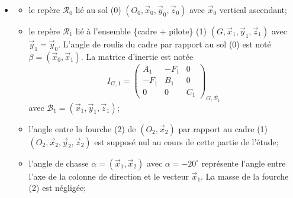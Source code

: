 \documentclass[10pt]{article}
\begin{document}
\begin{itemize}
  \item[]
  \begin{itemize}
    \item[-] le repère $\mathcal{R}_{0}$ lié au sol (0) $\left(O_{0}, \vec{x}_{0}, \vec{y}_{0}, \vec{z}_{0}\right)$ avec $\vec{x}_{0}$ vertical ascendant;
    \item[-] le repère $\mathcal{R}_{1}$ lié à l'ensemble \{cadre + pilote\} (1) $\left(G, \vec{x}_{1}, \vec{y}_{1}, \vec{z}_{1}\right)$ avec $\vec{y}_{1}=\vec{y}_{0}$. L'angle de roulis du cadre par rapport au sol (0) est noté $\beta=\left(\vec{x}_{0}, \vec{x}_{1}\right)$. La matrice d'inertie est notée
$$
I_{G, 1}=\left(\begin{array}{ccc}
A_{1} & -F_{1} & 0 \\
-F_{1} & B_{1} & 0 \\
0 & 0 & C_{1}
\end{array}\right)_{G, \mathcal{B}_{1}}
$$
avec $\mathcal{B}_{1}=\left(\vec{x}_{1}, \vec{y}_{1}, \vec{z}_{1}\right)$;
    \item[-] l'angle entre la fourche (2) de $\left(O_{2}, \vec{x}_{2}\right)$ par rapport au cadre (1) $\left(O_{2}, \vec{x}_{2}, \vec{y}_{2}, \vec{z}_{2}\right)$ est supposé nul au cours de cette partie de l'étude;
    \item[-] l'angle de chasse $\alpha=\left(\vec{x}_{1}, \vec{x}_{2}\right)$ avec $\alpha=-20^{\circ}$ représente l'angle entre l'axe de la colonne de direction et le vecteur $\vec{x}_{1}$. La masse de la fourche (2) est négligée;
  \end{itemize}
\end{itemize}
\end{document}
